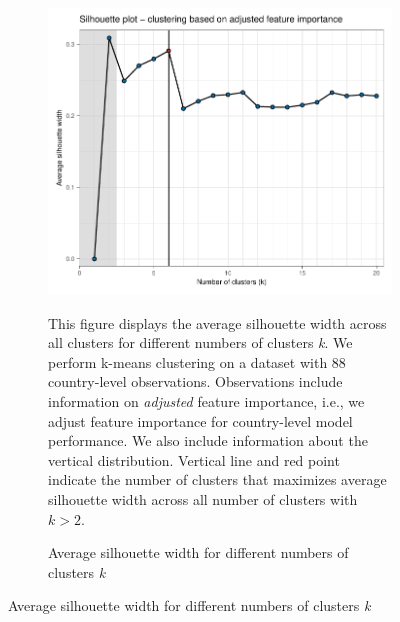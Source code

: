 \begin{figure}[ht!]
\centering
  \caption{Silhouette analysis}\label{fig:Silhouette}
   \begin{subfigure}[b]{\textwidth}
   \centering
   \includegraphics{Figures_Appendix/Figure_Silhouette_2.pdf}
   \caption{Average silhouette width for different numbers of clusters \textit{k}} \label{fig:G3_silhouette_2}
   \begin{subcaption2}
     This figure displays the average silhouette width across all clusters for different numbers of clusters \textit{k}. We perform k-means clustering on a dataset with 88 country-level observations. Observations include information on \textit{adjusted} feature importance, i.e., we adjust feature importance for country-level model performance. We also include information about the vertical distribution. Vertical line and red point indicate the number of clusters that maximizes average silhouette width across all number of clusters with $k>2$.
   \end{subcaption2}
   \end{subfigure}
 \end{figure}
 \clearpage

